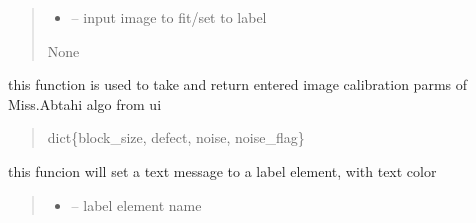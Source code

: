 \documentclass[letterpaper,10pt,english]{sphinxmanual}
\begin{document}
\begin{savenotes}
\begin{fulllineitems}
\begin{savenotes}
\begin{fulllineitems}
\begin{quote}
\begin{description}
\begin{itemize}
\item {} 
\sphinxAtStartPar
{} – input image to fit/set to label

\end{itemize}

\sphinxAtStartPar
None

\end{description}\end{quote}

\end{fulllineitems}\end{savenotes}


\begin{savenotes}\begin{fulllineitems}
\label{\detokenize{setting/setting_UI:oxin.setting_UI.UI_main_window.set_image_proccessing_parms_to_ui}}
\pysigstartsignatures
{}
\pysigstopsignatures
\sphinxAtStartPar
this function is used to take and return entered image calibration parms of Miss.Abtahi algo from ui
\begin{quote}\begin{description}
\sphinxAtStartPar
dict\{block\_size, defect, noise, noise\_flag\}

\end{description}\end{quote}

\end{fulllineitems}\end{savenotes}


\begin{savenotes}\begin{fulllineitems}
\label{\detokenize{setting/setting_UI:oxin.setting_UI.UI_main_window.set_label}}
\pysigstartsignatures
{}
\pysigstopsignatures
\sphinxAtStartPar
this funcion will set a text message to a label element, with text color
\begin{quote}\begin{description}
\begin{itemize}
\item {} 
\sphinxAtStartPar
{} – label element name


\end{itemize}
\end{description}
\end{quote}
\end{fulllineitems}
\end{savenotes}
\end{fulllineitems}
\end{savenotes}
\end{document}
